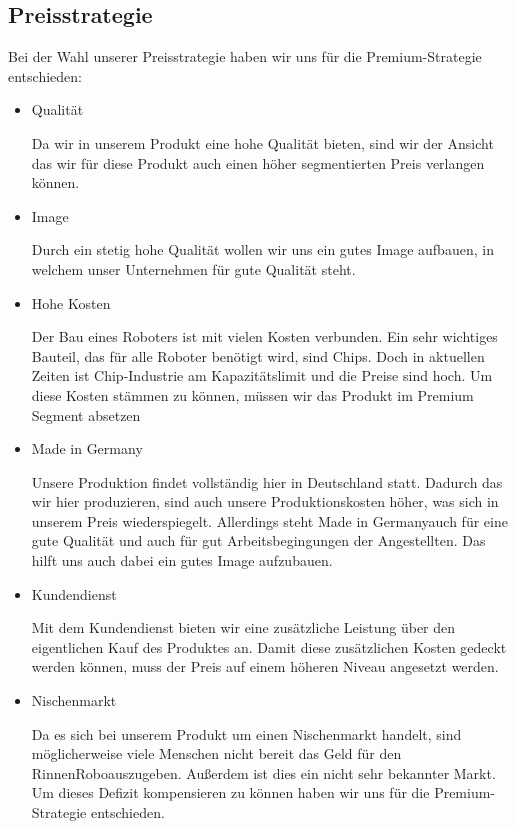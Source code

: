 \subsection{Preisstrategie} 
    Bei der Wahl unserer Preisstrategie haben wir uns für die Premium-Strategie entschieden:
    
        \begin{itemize}
            \item Qualität
            
                Da wir in unserem Produkt eine hohe Qualität bieten, sind wir der Ansicht das wir für diese Produkt auch
                einen höher segmentierten Preis verlangen können.

            \item Image
            
                Durch ein stetig hohe Qualität wollen wir uns ein gutes Image aufbauen, in welchem unser Unternehmen für
                gute Qualität steht.

            \item Hohe Kosten

                Der Bau eines Roboters ist mit vielen Kosten verbunden. Ein sehr wichtiges Bauteil, das für alle Roboter
                benötigt wird, sind Chips. Doch in aktuellen Zeiten ist Chip-Industrie am Kapazitätslimit und die Preise
                sind hoch. Um diese Kosten stämmen zu können, müssen wir das Produkt im Premium Segment absetzen

            \item Made in Germany
            
                Unsere Produktion findet vollständig hier in Deutschland statt. Dadurch das wir hier produzieren, sind
                auch unsere Produktionskosten höher, was sich in unserem Preis wiederspiegelt. Allerdings steht \as Made
                in Germany\adl auch für eine gute Qualität und auch für gut Arbeitsbegingungen der Angestellten. Das
                hilft uns auch dabei ein gutes Image aufzubauen.

            \item Kundendienst
            
                Mit dem Kundendienst bieten wir eine zusätzliche Leistung über den eigentlichen Kauf des Produktes
                an. Damit diese zusätzlichen Kosten gedeckt werden können, muss der Preis auf einem höheren Niveau 
                angesetzt werden.

            \item Nischenmarkt
            
                Da es sich bei unserem Produkt um einen Nischenmarkt handelt, sind möglicherweise viele Menschen nicht 
                bereit das Geld für den \as RinnenRobo\adl auszugeben. Außerdem ist dies ein nicht sehr bekannter Markt.
                Um dieses Defizit kompensieren zu können haben wir uns für die Premium-Strategie entschieden.
        \end{itemize}

